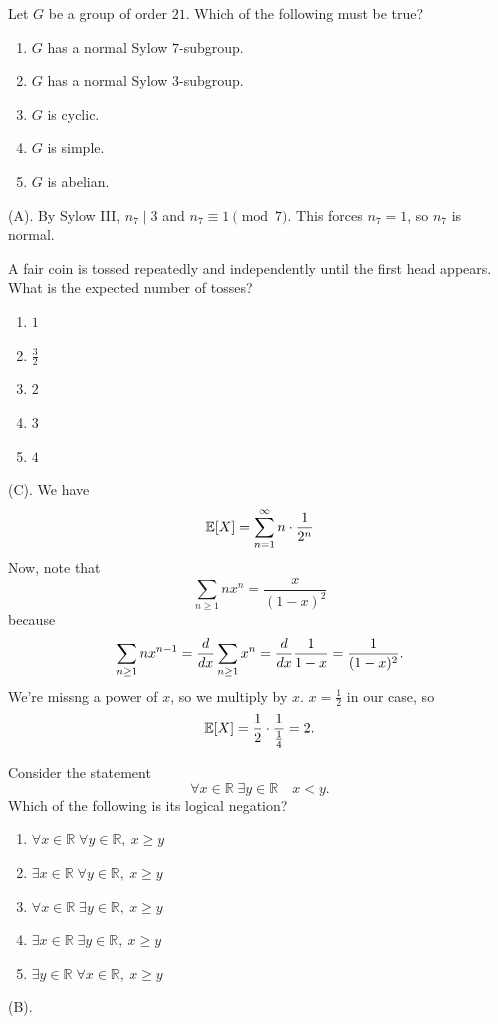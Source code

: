 \begin{exercise}
Let $G$ be a group of order $21$.
Which of the following must be true?
\begin{enumerate}[label=(\Alph*)]
\item $G$ has a normal Sylow $7$-subgroup.
\item $G$ has a normal Sylow $3$-subgroup.
\item $G$ is cyclic.
\item $G$ is simple.
\item $G$ is abelian.
\end{enumerate}
\end{exercise}
\begin{solution}
(A). By Sylow III, $n_7 \mid 3$ and $n_7 \equiv 1 \pmod{7}$. This forces 
$n_7 = 1$, so $n_7$ is normal.
\end{solution}

\begin{exercise}
A fair coin is tossed repeatedly and independently until the first head appears.
What is the expected number of tosses?
\begin{enumerate}[label=(\Alph*)]
\item $1$
\item $\frac32$
\item $2$
\item $3$
\item $4$
\end{enumerate}
\end{exercise}
\begin{solution}
(C). We have
\[
\mathbb{E}[X] = \sum_{n = 1}^{\infty} n \cdot \frac{1}{2^n}
\]
Now, note that 
\[
\sum_{n \geq 1} nx^n = \frac{x}{(1-x)^2}
\]
because
\[
\sum_{n \geq 1} nx^{n - 1} = \frac{d }{d x} \sum_{n \geq 1} x^n
= \frac{d }{d x} \frac{1}{1-x} = \frac{1}{(1-x)^2}.
\]
We're missng a power of $x$, so we multiply by $x$.
$x = \frac{1}{2}$ in our case, so 
\[
\mathbb{E}[X] = \frac{1}{2} \cdot \frac{1}{\frac{1}{4}} = 2.
\]
\end{solution}

\begin{exercise}
Consider the statement
\[
\forall x\in\mathbb R\;
\exists y\in\mathbb R
\quad x<y.
\]
Which of the following is its logical
negation?
\begin{enumerate}[label=(\Alph*)]
\item $\forall x\in\mathbb R\;
\forall y\in\mathbb R,\ x\geq y$
\item $\exists x\in\mathbb R\;
\forall y\in\mathbb R,\ x\geq y$
\item $\forall x\in\mathbb R\;
\exists y\in\mathbb R,\ x\geq y$
\item $\exists x\in\mathbb R\;
\exists y\in\mathbb R,\ x\geq y$
\item $\exists y\in\mathbb R\;
\forall x\in\mathbb R,\ x\geq y$
\end{enumerate}
\end{exercise}
\begin{solution}
(B).
\end{solution}

